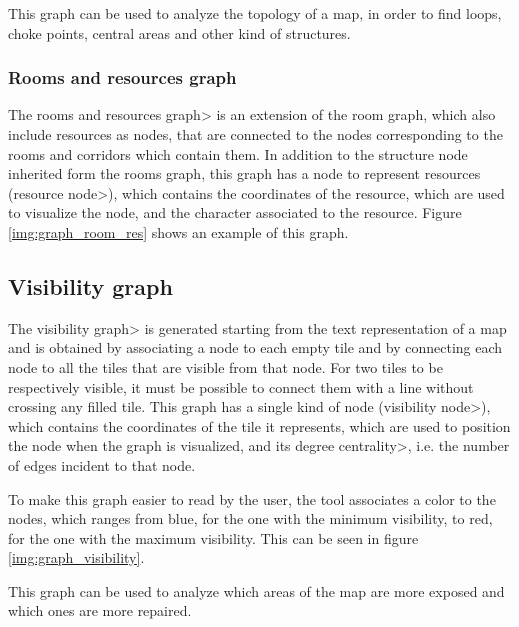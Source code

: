 \par

This graph can be used to analyze the topology of a map, in order to find loops, choke points, central areas and other kind of structures.

\subsubsection{Rooms and resources graph}

The \<rooms and resources graph> is an extension of the room graph, which also include resources as nodes, that are connected to the nodes corresponding to the rooms and corridors which contain them. In addition to the structure node inherited form the rooms graph, this graph has a node to represent resources (\<resource node>), which contains the coordinates of the resource, which are used to visualize the node, and the character associated to the resource. Figure \ref{img:graph_room_res} shows an example of this graph.

\subsection{Visibility graph}

The \<visibility graph> is generated starting from the text representation of a map and is obtained by associating a node to each empty tile and by connecting each node to all the tiles that are visible from that node. For two tiles to be respectively visible, it must be possible to connect them with a line without crossing any filled tile. This graph has a single kind of node (\<visibility node>), which contains the coordinates of the tile it represents, which are used to position the node when the graph is visualized, and its \<degree centrality>, i.e. the number of edges incident to that node. 

\par

To make this graph easier to read by the user, the tool associates a color to the nodes, which ranges from blue, for the one with the minimum visibility, to red, for the one with the maximum visibility. This can be seen in figure \ref{img:graph_visibility}.

\par

This graph can be used to analyze which areas of the map are more exposed and which ones are more repaired.

